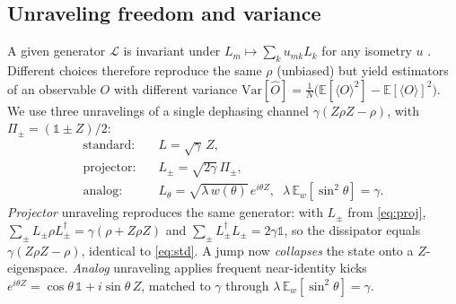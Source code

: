 \documentclass{ieeeaccess}
\newcommand{\expv}[1]{\langle #1 \rangle}
\begin{document}
\subsection{Unraveling freedom and variance}
A given generator $\mathcal{L}$ is invariant under
$L_m\mapsto \sum_k u_{mk} L_k$ for any isometry $u$ \cite{breuer_petruccione}. Different choices
therefore reproduce the same $\rho$ (unbiased) but yield estimators of an observable $O$ with
different variance $\mathrm{Var}[\hat O]=\tfrac{1}{N}\big(\mathbb{E}[\expv{O}^2]-\mathbb{E}[\expv{O}]^2\big)$.
We use three unravelings of a single dephasing channel $\gamma(Z\rho Z-\rho)$, with
$\Pi_\pm=(\mathbb{1}\pm Z)/2$:
\begin{align}
\text{standard:}\quad & L = \sqrt{\gamma}\,Z, \label{eq:std}\\
\text{projector:}\quad & L_\pm = \sqrt{2\gamma}\,\Pi_\pm, \label{eq:proj}\\
\text{analog:}\quad & L_\theta = \sqrt{\lambda\,w(\theta)}\,e^{i\theta Z},\;\;
\lambda\,\mathbb{E}_w[\sin^2\theta]=\gamma. \label{eq:analog}
\end{align}
\emph{Projector} unraveling reproduces the same generator: with $L_\pm$ from \eqref{eq:proj},
$\sum_\pm L_\pm\rho L_\pm^\dagger = \gamma(\rho + Z\rho Z)$ and $\sum_\pm L_\pm^\dagger L_\pm=2\gamma\mathbb{1}$,
so the dissipator equals $\gamma(Z\rho Z-\rho)$, identical to \eqref{eq:std}. A jump now
\emph{collapses} the state onto a $Z$-eigenspace. \emph{Analog} unraveling applies frequent
near-identity kicks $e^{i\theta Z}=\cos\theta\,\mathbb{1}+i\sin\theta\,Z$, matched to $\gamma$
through $\lambda\,\mathbb{E}_w[\sin^2\theta]=\gamma$.
\end{document}
